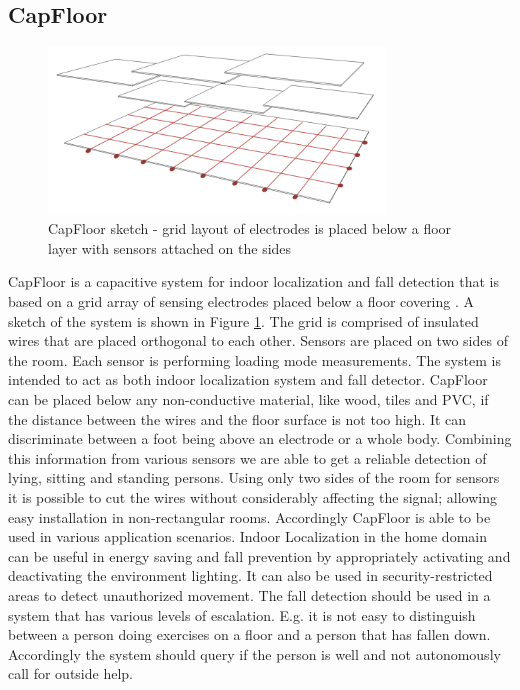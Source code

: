 \subsection{CapFloor}
\label{ch:prot_capfloor}
\begin{figure}[h]
\centering
\includegraphics[width=0.8\textwidth]{images/capfloor}
\caption{CapFloor sketch - grid layout of electrodes is placed below a floor layer with sensors attached on the sides}
\label{fig:capfloor_sketch}
\end{figure}

CapFloor is a capacitive system for indoor localization and fall detection that is based on a grid array of sensing electrodes placed below a floor covering \cite{Braun2012CapFloor}. A sketch of the system is shown in Figure \ref{fig:capfloor_sketch}. The grid is comprised of insulated wires that are placed orthogonal to each other. Sensors are placed on two sides of the room. Each sensor is performing loading mode measurements. The system is intended to act as both indoor localization system and fall detector. CapFloor can be placed below any non-conductive material, like wood, tiles and PVC, if the distance between the wires and the floor surface is not too high. It can discriminate between a foot being above an electrode or a whole body. Combining this information from various sensors we are able to get a reliable detection of lying, sitting and standing persons. Using only two sides of the room for sensors it is possible to cut the wires without considerably affecting the signal; allowing easy installation in non-rectangular rooms.
Accordingly CapFloor is able to be used in various application scenarios. Indoor Localization in the home domain can be useful in energy saving and fall prevention by appropriately activating and deactivating the environment lighting. It can also be used in security-restricted areas to detect unauthorized movement. The fall detection should be used in a system that has various levels of escalation. E.g. it is not easy to distinguish between a person doing exercises on a floor and a person that has fallen down. Accordingly the system should query if the person is well and not autonomously call for outside help.

